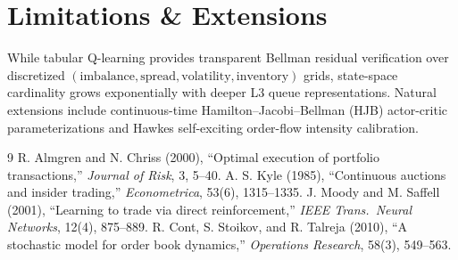 \documentclass[10pt,twocolumn,a4paper]{article}
\begin{document}
\section{Limitations \& Extensions}
While tabular Q-learning provides transparent Bellman residual verification over discretized $(\text{imbalance}, \text{spread}, \text{volatility}, \text{inventory})$ grids, state-space cardinality grows exponentially with deeper L3 queue representations. Natural extensions include continuous-time Hamilton--Jacobi--Bellman (HJB) actor-critic parameterizations and Hawkes self-exciting order-flow intensity calibration.

\footnotesize
\begin{thebibliography}{9}
\setlength{\itemsep}{0pt}
 R. Almgren and N. Chriss (2000), ``Optimal execution of portfolio transactions,'' \textit{Journal of Risk}, 3, 5--40.
 A. S. Kyle (1985), ``Continuous auctions and insider trading,'' \textit{Econometrica}, 53(6), 1315--1335.
 J. Moody and M. Saffell (2001), ``Learning to trade via direct reinforcement,'' \textit{IEEE Trans.\ Neural Networks}, 12(4), 875--889.
 R. Cont, S. Stoikov, and R. Talreja (2010), ``A stochastic model for order book dynamics,'' \textit{Operations Research}, 58(3), 549--563.
\end{thebibliography}
\end{document}
